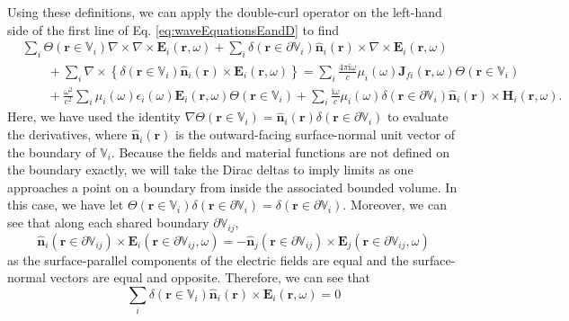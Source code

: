 \documentclass{article}
\begin{document}
Using these definitions, we can apply the double-curl operator on the left-hand side of the first line of Eq. \eqref{eq:waveEquationsEandD} to find
\begin{equation}\label{eq:waveEqEseparated}
\begin{split}
&\sum_i\Theta(\mathbf{r}\in\mathbb{V}_i)\nabla\times\nabla\times\mathbf{E}_i(\mathbf{r},\omega) + \sum_i\delta(\mathbf{r}\in\partial\mathbb{V}_i)\hat{\mathbf{n}}_i(\mathbf{r})\times\nabla\times\mathbf{E}_i(\mathbf{r},\omega)\\
&\qquad + \sum_i\nabla\times\left\{\delta(\mathbf{r}\in\mathbb{V}_i)\hat{\mathbf{n}}_i(\mathbf{r})\times\mathbf{E}_i(\mathbf{r},\omega)\right\} = \sum_i\frac{4\pi\mathrm{i}\omega}{c}\mu_i(\omega)\mathbf{J}_{fi}(\mathbf{r},\omega)\Theta(\mathbf{r}\in\mathbb{V}_i)\\
&\qquad + \frac{\omega^2}{c^2}\sum_i\mu_i(\omega)\epsilon_i(\omega)\mathbf{E}_i(\mathbf{r},\omega)\Theta(\mathbf{r}\in\mathbb{V}_i) + \sum_i\frac{\mathrm{i}\omega}{c}\mu_i(\omega)\delta(\mathbf{r}\in\partial\mathbb{V}_i)\hat{\mathbf{n}}_i(\mathbf{r})\times\mathbf{H}_i(\mathbf{r},\omega).
\end{split}
\end{equation}
Here, we have used the identity $\nabla\Theta(\mathbf{r}\in\mathbb{V}_i) = \hat{\mathbf{n}}_i(\mathbf{r})\delta(\mathbf{r}\in\partial\mathbb{V}_i)$ to evaluate the derivatives, where $\hat{\mathbf{n}}_i(\mathbf{r})$ is the outward-facing surface-normal unit vector of the boundary of $\mathbb{V}_i$. Because the fields and material functions are not defined on the boundary exactly, we will take the Dirac deltas to imply limits as one approaches a point on a boundary from inside the associated bounded volume. In this case, we have let $\Theta(\mathbf{r}\in\mathbb{V}_i)\delta(\mathbf{r}\in\partial\mathbb{V}_i) = \delta(\mathbf{r}\in\partial\mathbb{V}_i)$. Moreover, we can see that along each shared boundary $\partial\mathbb{V}_{ij}$,
\begin{equation}
\hat{\mathbf{n}}_i(\mathbf{r}\in\partial\mathbb{V}_{ij})\times\mathbf{E}_i(\mathbf{r}\in\partial\mathbb{V}_{ij},\omega) = -\hat{\mathbf{n}}_j(\mathbf{r}\in\partial\mathbb{V}_{ij})\times\mathbf{E}_j(\mathbf{r}\in\partial\mathbb{V}_{ij},\omega)
\end{equation}
as the surface-parallel components of the electric fields are equal and the surface-normal vectors are equal and opposite. Therefore, we can see that
\begin{equation}
\sum_i\delta(\mathbf{r}\in\mathbb{V}_i)\hat{\mathbf{n}}_i(\mathbf{r})\times\mathbf{E}_i(\mathbf{r},\omega) = 0
\end{equation}
\end{document}
